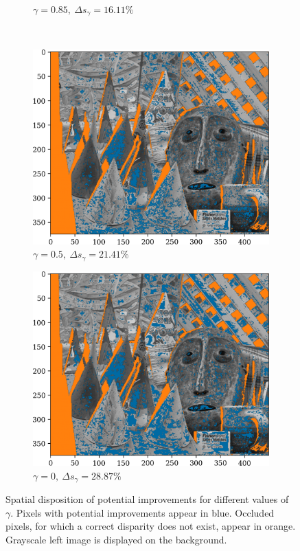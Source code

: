 \begin{figure}[ht]
\begin{subfigure}{0.48\linewidth}
        \caption{$\gamma=0.85,~\Delta s_\gamma=16.11\%$}
        \label{fig:improvements_b}
    \end{subfigure}\\
    \begin{subfigure}{0.48\linewidth}
        \centering
        \includegraphics[width=\linewidth]{Images/Chap_4/Improvements_Pl=0.5.png}
        \caption{$\gamma=0.5,~\Delta s_\gamma=21.41\%$}
        \label{fig:improvements_c}
    \end{subfigure}
    \begin{subfigure}{0.48\linewidth}
        \centering
        \includegraphics[width=\linewidth]{Images/Chap_4/Improvements_Pl=0.0.png}
        \caption{$\gamma=0,~\Delta s_\gamma=28.87\%$}
        \label{fig:improvements_d}
    \end{subfigure}
    \caption{Spatial disposition of potential improvements for different values of $\gamma$. Pixels with potential improvements appear in blue. Occluded pixels, for which a correct disparity does not exist, appear in orange. Grayscale left image is displayed on the background.}
    \label{fig:improvements}
\end{figure}

